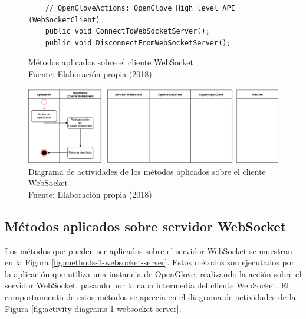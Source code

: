 \begin{figure}[H]
  \begin{center} 
      \begin{lstlisting}
	// OpenGloveActions: OpenGlove High level API (WebSocketClient)
	public void ConnectToWebSocketServer();
	public void DisconnectFromWebSocketServer();
	\end{lstlisting}
   \captionsetup{justification=centering}
    \caption[Métodos aplicados sobre el cliente WebSocket]{Métodos aplicados sobre el cliente WebSocket \\Fuente: Elaboración propia (2018)}
    \label{fig:methods-0-api-hl}
  \end{center}
\end{figure}



\begin{figure}[H]
  \begin{center} 
   	\includegraphics[width=1.0\textwidth]{images/chapter04/ActivityDiagrams-OpenGloveActions-0.png} 
   	\captionsetup{justification=centering}
    \caption[Diagrama de actividades de los métodos aplicados sobre el cliente WebSocket]{Diagrama de actividades de los métodos aplicados sobre el cliente WebSocket\\Fuente: Elaboración propia (2018)}
    \label{fig:activity-diagrams-0-api-hl}
  \end{center}
\end{figure}




\subsection{Métodos aplicados sobre servidor WebSocket}
\label{subsection:method-websocket-server}
Los métodos que pueden ser aplicados sobre el servidor WebSocket se muestran en la Figura \ref{fig:methods-1-websocket-server}. Estos métodos son ejecutados por la aplicación que utiliza una instancia de OpenGlove, realizando la acción sobre el servidor WebSocket, pasando por la capa intermedia del cliente WebSocket. El comportamiento de estos métodos se aprecia en el diagrama de actividades de la Figura \ref{fig:activity-diagrams-1-websocket-server}.




